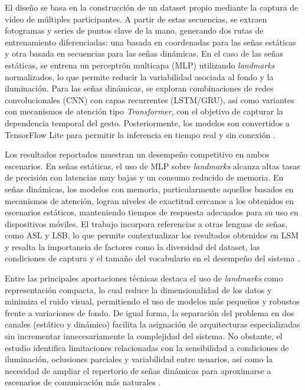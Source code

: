 	El diseño se basa en la construcción de un dataset propio mediante la captura de video de múltiples participantes. A partir de estas secuencias, se extraen fotogramas y series de puntos clave de la mano, generando dos rutas de entrenamiento diferenciadas: una basada en coordenadas para las señas estáticas y otra basada en secuencias para las señas dinámicas. En el caso de las señas estáticas, se entrena un perceptrón multicapa (MLP) utilizando \textit{landmarks} normalizados, lo que permite reducir la variabilidad asociada al fondo y la iluminación. Para las señas dinámicas, se exploran combinaciones de redes convolucionales (CNN) con capas recurrentes (LSTM/GRU), así como variantes con mecanismos de atención tipo \textit{Transformer}, con el objetivo de capturar la dependencia temporal del gesto. Posteriormente, los modelos son convertidos a TensorFlow Lite para permitir la inferencia en tiempo real y sin conexión \cite{salgado2024lsm_app_dl}.
	
	Los resultados reportados muestran un desempeño competitivo en ambos escenarios. En señas estáticas, el uso de MLP sobre \textit{landmarks} alcanza altas tasas de precisión con latencias muy bajas y un consumo reducido de memoria. En señas dinámicas, los modelos con memoria, particularmente aquellos basados en mecanismos de atención, logran niveles de exactitud cercanos a los obtenidos en escenarios estáticos, manteniendo tiempos de respuesta adecuados para su uso en dispositivos móviles. El trabajo incorpora referencias a otras lenguas de señas, como ASL y LSB, lo que permite contextualizar los resultados obtenidos en LSM y resalta la importancia de factores como la diversidad del dataset, las condiciones de captura y el tamaño del vocabulario en el desempeño del sistema \cite{salgado2024lsm_app_dl}.
	
	Entre las principales aportaciones técnicas destaca el uso de \textit{landmarks} como representación compacta, lo cual reduce la dimensionalidad de los datos y minimiza el ruido visual, permitiendo el uso de modelos más pequeños y robustos frente a variaciones de fondo. De igual forma, la separación del problema en dos canales (estático y dinámico) facilita la asignación de arquitecturas especializadas sin incrementar innecesariamente la complejidad del sistema. No obstante, el estudio identifica limitaciones relacionadas con la sensibilidad a condiciones de iluminación, oclusiones parciales y variabilidad entre usuarios, así como la necesidad de ampliar el repertorio de señas dinámicas para aproximarse a escenarios de comunicación más naturales \cite{salgado2024lsm_app_dl}.
	
